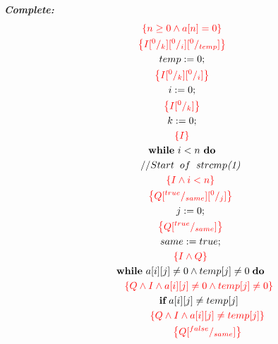 \documentclass [a4paper, 12pt, fleqn]  {article}
\newcommand{\assn}[1]{{\color{red}\left\{#1\right\}}}
\begin{document}
\textit{\textbf{Complete:}}
\begin{gather*}
\assn{ n \geq 0 \AND a[n] = 0   } \\
\assn{  I \subst 0k \subst 0i \subst 0 {temp}   } \\
temp \Ass 0; \\
\assn {  I \subst 0k \subst 0i  } \\
i \Ass 0; \\
\assn {  I \subst 0k  } \\
k \Ass 0; \\
\assn{ I } \\
\WHILE ~ i < n ~ \DO \\
\hspace{0.6cm} //Start \hspace{0.2cm} of \hspace{0.2cm} strcmp \textit{(1)} \\ %
\hspace{0.6cm} \assn{ I \AND i < n } \\
\hspace{0.6cm} \assn{ Q \subst {true} {same} \subst 0j  } \\
\hspace{0.6cm} j \Ass 0; \\
\hspace{0.6cm} \assn{  Q \subst {true} {same}  } \\
\hspace{0.6cm} same \Ass true; \\
\hspace{0.6cm} \assn{  I \AND Q} \\
\hspace{0.6cm} \WHILE ~ a[i][j] \neq 0 \AND temp[j] \neq 0 \hspace{0.1cm} \DO \\
\hspace{1.2cm} \assn{ Q \AND I \AND a[i][j] \neq 0 \AND temp[j] \neq 0  } \\
\hspace{0.6cm} \hspace{0.6cm} \IF \hspace{0.1cm} a[i][j] \neq temp[j] \\
\hspace{0.6cm} \hspace{1.2cm} \assn {Q \AND I \AND a[i][j] \neq temp[j]} \\
\hspace{0.6cm} \hspace{1.2cm} \assn{  Q \subst {false} {same} } \\

\end{gather*}
\end{document}
